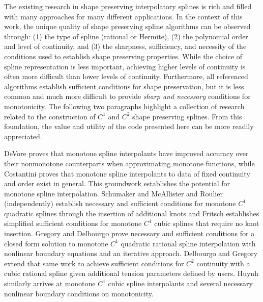 The existing research in shape preserving interpolatory splines is
rich and filled with many approaches for many different
applications. In the context of this work, the unique quality of shape
preserving spline algorithms can be observed through: (1) the type of
spline (rational or Hermite), (2) the polynomial order and level of
continuity, and (3) the sharpness, sufficiency, and necessity of the
conditions used to establish shape preserving properties. While the
choice of spline representation is less important, achieving higher
levels of continuity is often more difficult than lower levels of
continuity. Furthermore, all referenced algorithms establish
sufficient conditions for shape preservation, but it is less common
and much more difficult to provide {\it sharp and necessary}
conditions for monotonicity. The following two paragraphs highlight a
collection of research related to the construction of $C^1$ and $C^2$
shape preserving splines. From this foundation, the value and utility
of the code presented here can be more readily appreciated.

DeVore \cite{devore1977monotone} proves that monotone spline
interpolants have improved accuracy over their nonmonotone
counterparts when approximating monotone functions, while Costantini
\cite{constantini1986monotone} proves that monotone spline
interpolants to data of fixed continuity and order exist in
general. This groundwork establishes the potential for monotone spline
interpolation. Schumaker \cite{schumaker1983shape} and McAllister and
Roulier \cite{mcallister1981algorithm} (independently) establish
necessary and sufficient conditions for monotone $C^1$ quadratic
splines through the insertion of additional knots and Fritsch
\cite{fritsch1982LLNL} establishes simplified sufficient conditions
for monotone $C^1$ cubic splines that require no knot insertion.
Gregory and Delbourgo \cite{gregory1982piecewise} prove necessary and
sufficient conditions for a closed form solution to monotone $C^1$
quadratic rational spline interpolation with nonlinear boundary
equations and an iterative approach. Delbourgo and Gregory
\cite{delbourgo1983rational} extend that same work to achieve
sufficient conditions for $C^2$ continuity with a cubic rational
spline given additional tension parameters defined by users. Huynh
\cite{huynh1993accurate} similarly arrives at monotone $C^1$ cubic
spline interpolants and several necessary nonlinear boundary
conditions on monotonicity.


